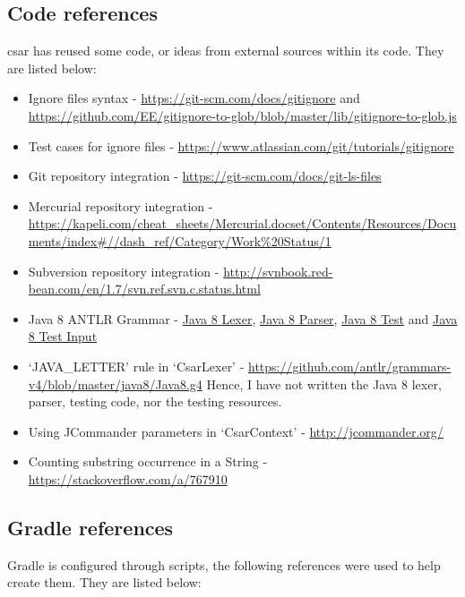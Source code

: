 \documentclass[12pt, letterpaper]{article}
\begin{document}
\subsection{Code references}
\label{sec:CodeReferences}
csar has reused some code, or ideas from external sources within its code. They are listed below:
\begin{itemize}
  \item Ignore files syntax - \url{https://git-scm.com/docs/gitignore} and \url{https://github.com/EE/gitignore-to-glob/blob/master/lib/gitignore-to-glob.js}
  \item Test cases for ignore files - \url{https://www.atlassian.com/git/tutorials/gitignore}
  \item Git repository integration - \url{https://git-scm.com/docs/git-ls-files}
  \item Mercurial repository integration - \url{https://kapeli.com/cheat_sheets/Mercurial.docset/Contents/Resources/Documents/index#//dash_ref/Category/Work%20Status/1}
  \item Subversion repository integration - \url{http://svnbook.red-bean.com/en/1.7/svn.ref.svn.c.status.html}
  \item Java 8 ANTLR Grammar - \href{https://github.com/antlr/grammars-v4/blob/02711067f82bed8e0c8dfd25e80f4f8ae2472abd/java8-pt/JavaLexer.g4}{Java 8 Lexer}, \href{https://github.com/antlr/grammars-v4/blob/02711067f82bed8e0c8dfd25e80f4f8ae2472abd/java8-pt/JavaParser.g4}{Java 8 Parser}, \href{https://github.com/antlr/grammars-v4/blob/02711067f82bed8e0c8dfd25e80f4f8ae2472abd/_grammar-test/src/test/java/TestJava8pt.java}{Java 8 Test} and \href{https://github.com/antlr/grammars-v4/blob/02711067f82bed8e0c8dfd25e80f4f8ae2472abd/java8-pt/examples/AllInOne8.java}{Java 8 Test Input}
  \item `JAVA\_LETTER' rule in `CsarLexer' - \url{https://github.com/antlr/grammars-v4/blob/master/java8/Java8.g4}
  Hence, I have not written the Java 8 lexer, parser, testing code, nor the testing resources.
  \item Using JCommander parameters in `CsarContext' - \url{http://jcommander.org/}
  \item Counting substring occurrence in a String - \url{https://stackoverflow.com/a/767910}
\end{itemize}

\subsection{Gradle references}
Gradle is configured through scripts, the following references were used to help create them. They are listed below:
\end{document}
